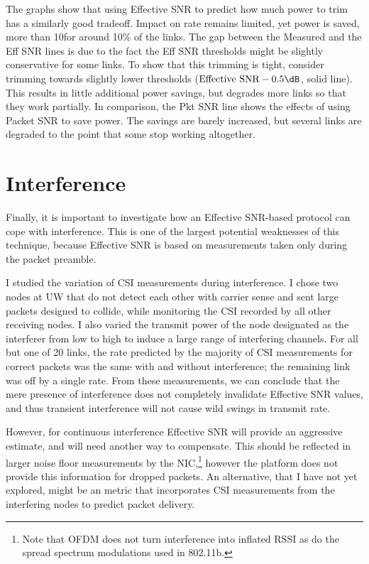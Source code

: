 The graphs show that using Effective SNR to predict how much power to trim has a similarly good tradeoff. Impact on rate remains limited, yet power is saved, more than 10\dB for around 10\% of the links. The gap between the Measured and the Eff SNR lines is due to the fact the Eff SNR thresholds might be slightly conservative for some links. To show that this trimming is tight, consider trimming towards slightly lower thresholds ($\text{Effective SNR}-\text{0.5\dB}$, solid line). This results in little additional power savings, but degrades more links so that they work partially. In comparison, the Pkt SNR line shows the effects of using Packet SNR to save power. The savings are barely increased, but several links are degraded to the point that some stop working altogether.

\section{Interference}
\label{sec:interference}
Finally, it is important to investigate how an Effective SNR-based protocol can cope with interference. This is one of the largest potential weaknesses of this technique, because Effective SNR is based on measurements taken only during the packet preamble.%

I studied the variation of CSI measurements during interference. I chose two nodes at UW that do not detect each other with carrier sense and sent large packets designed to collide, while monitoring the CSI recorded by all other receiving nodes. I also varied the transmit power of the node designated as the interferer from low to high to induce a large range of interfering channels. For all but one of 20 links, the rate predicted by the majority of CSI measurements for correct packets was the same with and without interference; the remaining link was off by a single rate. From these measurements, we can conclude that the mere presence of interference does not completely invalidate Effective SNR values, and thus transient interference will not cause wild swings in transmit rate.

However, for continuous interference Effective SNR will provide an aggressive estimate, and will need another way to compensate. This should be reflected in larger noise floor measurements by the NIC,\footnote{Note that OFDM does not turn interference into inflated RSSI as do the spread spectrum modulations used in 802.11b.} however the platform does not provide this information for dropped packets. An alternative, that I have not yet explored, might be an  metric that incorporates CSI measurements from the interfering nodes to predict packet delivery.

